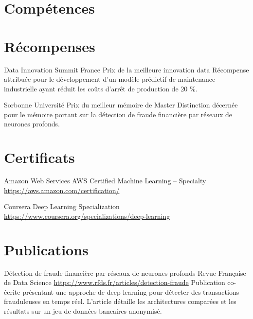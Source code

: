 \documentclass[a4paper, serif, 10pt]{moderncv}
\begin{document}
\section{Compétences}

\section{Récompenses}

        {Data Innovation Summit France}
        {Prix de la meilleure innovation data}
        {}
        {}
        {Récompense attribuée pour le développement d'un modèle prédictif de maintenance industrielle ayant réduit les coûts d'arrêt de production de 20 \%.}

        {Sorbonne Université}
        {Prix du meilleur mémoire de Master}
        {}
        {}
        {Distinction décernée pour le mémoire portant sur la détection de fraude financière par réseaux de neurones profonds.}
\section{Certificats}

        {Amazon Web Services}
        {AWS Certified Machine Learning – Specialty}
        {\url{https://aws.amazon.com/certification/}}
        {}
        {}

        {Coursera}
        {Deep Learning Specialization}
        {\url{https://www.coursera.org/specializations/deep-learning}}
        {}
        {}
\section{Publications}

        {Détection de fraude financière par réseaux de neurones profonds}
        {Revue Française de Data Science}
        {\url{https://www.rfds.fr/articles/detection-fraude}}
        {}
        {Publication co-écrite présentant une approche de deep learning pour détecter des transactions frauduleuses en temps réel. L'article détaille les architectures comparées et les résultats sur un jeu de données bancaires anonymisé.}
\end{document}
